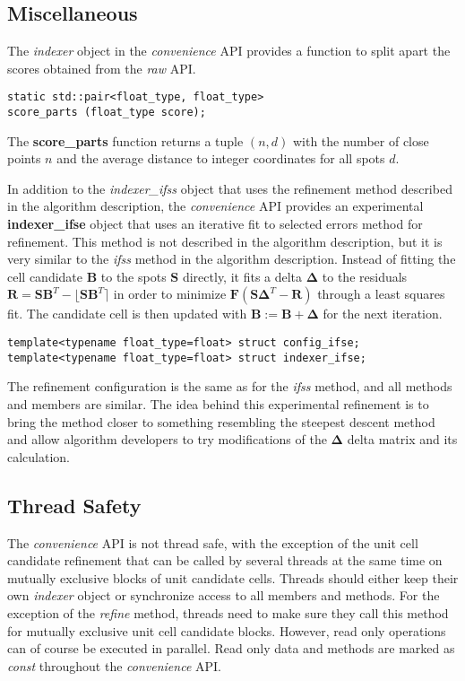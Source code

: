 \documentclass[a4paper,10pt]{article}
\newcommand{\mat}[1]{\mathbf{#1}}
\newcommand{\round}[1]{\lfloor #1 \rceil}
\begin{document}
\subsection{Miscellaneous}

The \emph{indexer} object in the \emph{convenience} API provides a function to split apart the scores obtained from the \emph{raw} API.

\begin{lstlisting}
static std::pair<float_type, float_type>
score_parts (float_type score);
\end{lstlisting}

The \textbf{score\_parts} function returns a tuple $(n,d)$ with the number of close points $n$ and the average distance to integer coordinates for all spots $d$.

In addition to the \emph{indexer\_ifss} object that uses the refinement method described in the algorithm description, the \emph{convenience} API provides an experimental \textbf{indexer\_ifse} object that uses an iterative fit to selected errors method for refinement. This method is not described in the algorithm description, but it is very similar to the \emph{ifss} method in the algorithm description. Instead of fitting the cell candidate $\mat{B}$ to the spots $\mat{S}$ directly, it fits a delta $\mat{\Delta}$ to the residuals $\mat{R} = \mat{S}\mat{B}^T - \round{\mat{S}\mat{B}^T}$ in order to minimize $\mat{F}(\mat{S}\mat{\Delta}^T - \mat{R})$ through a least squares fit. The candidate cell is then updated with $\mat{B}:=\mat{B}+\mat{\Delta}$ for the next iteration.

\begin{lstlisting}
template<typename float_type=float> struct config_ifse;
template<typename float_type=float> struct indexer_ifse;
\end{lstlisting}

The refinement configuration is the same as for the \emph{ifss} method, and all methods and members are similar. The idea behind this experimental refinement is to bring the method closer to something resembling the steepest descent method and allow algorithm developers to try modifications of the $\mat{\Delta}$ delta matrix and its calculation.

\subsection{Thread Safety}

The \emph{convenience} API is not thread safe, with the exception of the unit cell candidate refinement that can be called by several threads at the same time on mutually exclusive blocks of unit candidate cells. Threads should either keep their own \emph{indexer} object or synchronize access to all members and methods. For the exception of the \emph{refine} method, threads need to make sure they call this method for mutually exclusive unit cell candidate blocks. However, read only operations can of course be executed in parallel. Read only data and methods are marked as \emph{const} throughout the \emph{convenience} API.
\end{document}
